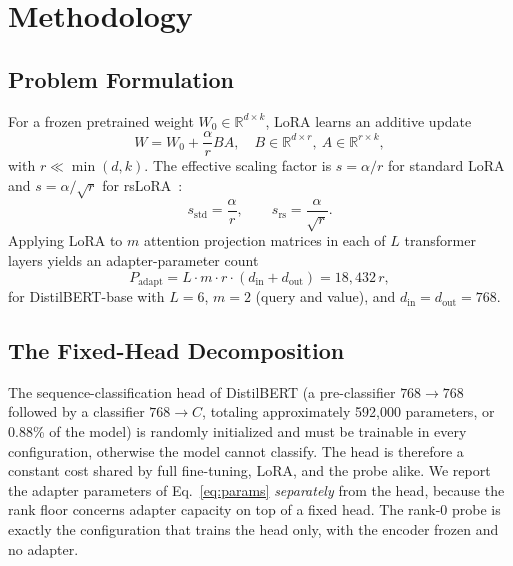 \documentclass[conference]{IEEEtran}
\begin{document}
\section{Methodology}
\label{sec:method}

\subsection{Problem Formulation}
For a frozen pretrained weight $W_0 \in \mathbb{R}^{d \times k}$, LoRA learns an additive update
\begin{equation}
W = W_0 + \frac{\alpha}{r} B A, \quad B \in \mathbb{R}^{d \times r}, \ A \in \mathbb{R}^{r \times k},
\end{equation}
with $r \ll \min(d,k)$. The effective scaling factor is $s = \alpha/r$ for standard LoRA and $s = \alpha/\sqrt{r}$ for rsLoRA~\cite{kalajdzievski2023rslora}:
\begin{equation}
s_{\mathrm{std}} = \frac{\alpha}{r}, \qquad s_{\mathrm{rs}} = \frac{\alpha}{\sqrt{r}}.
\end{equation}
Applying LoRA to $m$ attention projection matrices in each of $L$ transformer layers yields an adapter-parameter count
\begin{equation}
P_{\mathrm{adapt}} = L \cdot m \cdot r \cdot (d_{\mathrm{in}} + d_{\mathrm{out}}) = 18{,}432\,r,
\label{eq:params}
\end{equation}
for DistilBERT-base with $L{=}6$, $m{=}2$ (query and value), and $d_{\mathrm{in}}{=}d_{\mathrm{out}}{=}768$.

\subsection{The Fixed-Head Decomposition}
The sequence-classification head of DistilBERT (a pre-classifier $768 \to 768$ followed by a classifier $768 \to C$, totaling approximately 592{,}000 parameters, or 0.88\% of the model) is randomly initialized and must be trainable in every configuration, otherwise the model cannot classify. The head is therefore a constant cost shared by full fine-tuning, LoRA, and the probe alike. We report the adapter parameters of Eq.~\eqref{eq:params} \emph{separately} from the head, because the rank floor concerns adapter capacity on top of a fixed head. The rank-0 probe is exactly the configuration that trains the head only, with the encoder frozen and no adapter.
\end{document}

